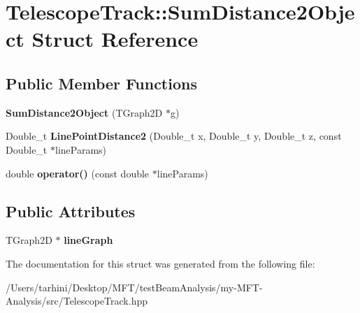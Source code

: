 \hypertarget{struct_telescope_track_1_1_sum_distance2_object}{}\section{Telescope\+Track\+:\+:Sum\+Distance2\+Object Struct Reference}
\label{struct_telescope_track_1_1_sum_distance2_object}
\subsection*{Public Member Functions}
\begin{DoxyCompactItemize}
\item 
\mbox{\label{struct_telescope_track_1_1_sum_distance2_object_ae3ccb274f2191e028ce952179e9ec84c}} 
{\bfseries Sum\+Distance2\+Object} (T\+Graph2D $\ast$g)
\item 
\mbox{\label{struct_telescope_track_1_1_sum_distance2_object_a916314f3e57da425cd578cec12b136c0}} 
Double\+\_\+t {\bfseries Line\+Point\+Distance2} (Double\+\_\+t x, Double\+\_\+t y, Double\+\_\+t z, const Double\+\_\+t $\ast$line\+Params)
\item 
\mbox{\label{struct_telescope_track_1_1_sum_distance2_object_af7634ef093c114cb7457cbea0445b52d}} 
double {\bfseries operator()} (const double $\ast$line\+Params)
\end{DoxyCompactItemize}
\subsection*{Public Attributes}
\begin{DoxyCompactItemize}
\item 
\mbox{\label{struct_telescope_track_1_1_sum_distance2_object_aaa771260b176fef3365841e0b532ca15}} 
T\+Graph2D $\ast$ {\bfseries line\+Graph}
\end{DoxyCompactItemize}


The documentation for this struct was generated from the following file\+:\begin{DoxyCompactItemize}
\item 
/\+Users/tarhini/\+Desktop/\+M\+F\+T/test\+Beam\+Analysis/my-\/\+M\+F\+T-\/\+Analysis/src/Telescope\+Track.\+hpp\end{DoxyCompactItemize}
